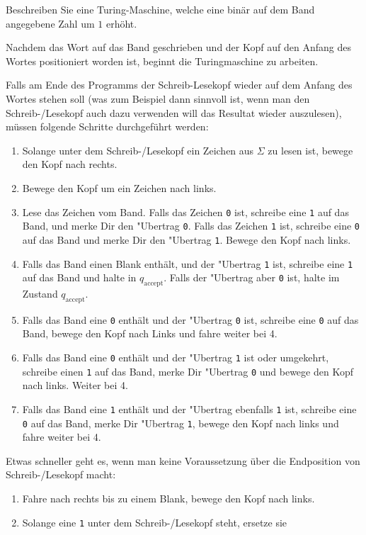 Beschreiben Sie eine Turing-Maschine, welche eine binär auf dem
Band angegebene Zahl um $1$ erhöht.


\begin{loesung}
Nachdem das Wort auf das Band geschrieben und der Kopf auf den
Anfang des Wortes positioniert worden ist, beginnt die Turingmaschine
zu arbeiten. 

Falls am Ende des Programms der Schreib-Lesekopf wieder auf dem
Anfang des Wortes stehen soll (was zum Beispiel dann sinnvoll ist,
wenn man den Schreib-/Lesekopf auch dazu verwenden will das
Resultat wieder auszulesen),  müssen folgende
Schritte durchgeführt werden:
\begin{enumerate}
\item Solange unter dem Schreib-/Lesekopf ein Zeichen aus $\Sigma$
zu lesen ist, bewege den Kopf nach rechts.
\item Bewege den Kopf um ein Zeichen nach links.
\item Lese das Zeichen vom Band. Falls das Zeichen {\tt 0} ist,
schreibe eine {\tt 1} auf das Band, und merke Dir den "Ubertrag {\tt 0}.
Falls das Zeichen {\tt 1} ist, schreibe eine {\tt 0} auf das Band und
merke Dir den "Ubertrag {\tt 1}.
Bewege den Kopf nach links.
\item Falls das Band einen Blank enthält, und der "Ubertrag {\tt 1}
ist, schreibe eine {\tt 1} auf das Band und halte in $q_{\text{accept}}$.
Falls der "Ubertrag aber {\tt 0} ist, halte im Zustand $q_{\text{accept}}$.
\item Falls das Band eine {\tt 0} enthält und der "Ubertrag {\tt 0} ist,
schreibe eine {\tt 0} auf das Band, bewege den Kopf nach Links und fahre
weiter bei 4.
\item Falls das Band eine {\tt 0} enthält und der "Ubertrag {\tt 1}
ist oder umgekehrt, schreibe einen {\tt 1} auf das Band, merke Dir
"Ubertrag {\tt 0} und bewege den Kopf nach links. Weiter bei 4.
\item Falls das Band eine {\tt 1} enthält und der "Ubertrag ebenfalls
{\tt 1} ist, schreibe eine {\tt 0} auf das Band, merke Dir "Ubertrag {\tt 1},
bewege den Kopf nach links und fahre weiter bei 4.
\end{enumerate}
Etwas schneller geht es, wenn man keine Voraussetzung über die
Endposition von Schreib-/Lesekopf macht:
\begin{enumerate}
\item Fahre nach rechts bis zu einem Blank, bewege den Kopf nach links.
\item Solange eine {\tt 1} unter dem Schreib-/Lesekopf steht, ersetze sie

\end{enumerate}
\end{loesung}
